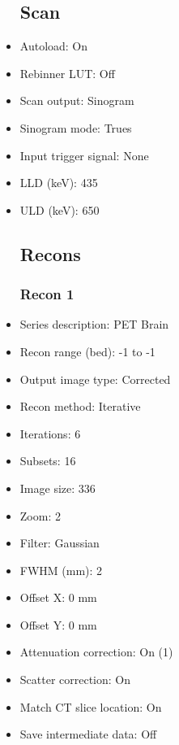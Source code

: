\documentclass[12pt]{article}
\begin{document}
\begin{itemize}
\subsection{Scan}
\item Autoload: On
\item Rebinner LUT: Off
\item Scan output: Sinogram
\item Sinogram mode: Trues
\item Input trigger signal: None
\item LLD (keV): 435
\item ULD (keV): 650
\subsection{Recons}
\subsubsection{Recon 1}
\item Series description: PET Brain
\item Recon range (bed): -1 to -1
\item Output image type: Corrected
\item Recon method: Iterative
\item Iterations: 6
\item Subsets: 16
\item Image size: 336
\item Zoom: 2
\item Filter: Gaussian
\item FWHM (mm): 2
\item Offset X: 0 mm
\item Offset Y: 0 mm
\item Attenuation correction: On (1)
\item Scatter correction: On
\item Match CT slice location: On
\item Save intermediate data: Off
\end{itemize}
\end{document}
